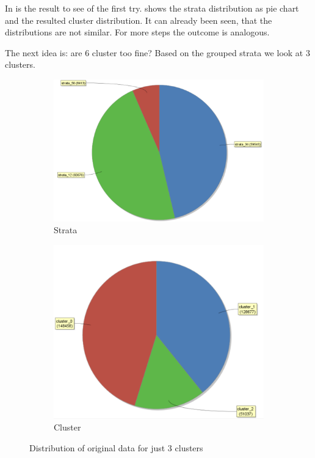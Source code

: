 In  is the result to see of the first try.  shows the strata distribution as pie chart and  the resulted cluster distribution. It can already been seen, that the distributions are not similar. For more steps the outcome is analogous.

The next idea is: are 6 cluster too fine? Based on the grouped strata we look at 3 clusters.

\begin{figure}[H]
\centering
\begin{subfigure}{.4\textwidth}
  \centering
  \includegraphics[width=.8\linewidth]{ClusterOrigRapidStrata2Cluster.PNG}
  \caption{Strata}
  \label{fig:OrgSt3}
\end{subfigure}%
\begin{subfigure}{.35\textwidth}
  \centering
  \includegraphics[width=.8\linewidth]{ClusterOrigRapidCluster2Cluster.PNG}
  \caption{Cluster}
  \label{fig:OrgCl3}
\end{subfigure}
\caption{Distribution of original data for just 3 clusters}
\label{fig:OrgDist3Cl}
\end{figure}

